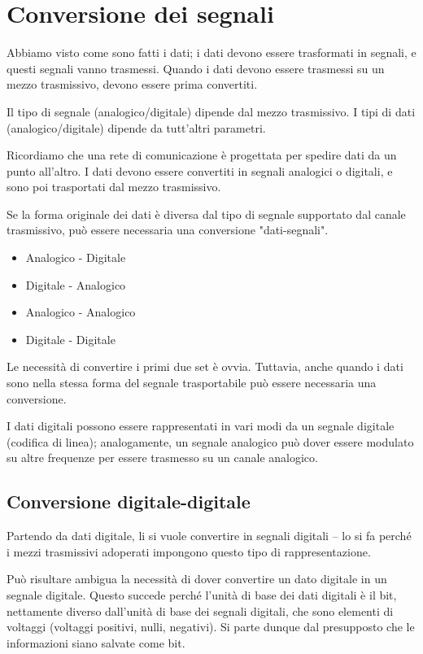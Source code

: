 \section{Conversione dei segnali}

    Abbiamo visto come sono fatti i dati; i dati devono essere trasformati in segnali, e questi segnali vanno trasmessi. Quando i dati devono essere trasmessi su un mezzo trasmissivo, devono essere prima convertiti.
    
    Il tipo di segnale (analogico/digitale) dipende dal mezzo trasmissivo. I tipi di dati (analogico/digitale) dipende da tutt'altri parametri.
    
    Ricordiamo che una rete di comunicazione è progettata per spedire dati da un punto all'altro. I dati devono essere convertiti in segnali analogici o digitali, e sono poi trasportati dal mezzo trasmissivo.
    
    Se la forma originale dei dati è diversa dal tipo di segnale supportato dal canale trasmissivo, può essere necessaria una conversione "dati-segnali".
    
    \begin{itemize}
        \item Analogico - Digitale
        \item Digitale - Analogico
        \item Analogico - Analogico
        \item Digitale - Digitale
    \end{itemize}
    
    Le necessità di convertire i primi due set è ovvia. Tuttavia, anche quando i dati sono nella stessa forma del segnale trasportabile può essere necessaria una conversione. 
    
    I dati digitali possono essere rappresentati in vari modi da un segnale digitale (codifica di linea); analogamente, un segnale analogico può dover essere modulato su altre frequenze per essere trasmesso su un canale analogico.
    
    \subsection{Conversione digitale-digitale}
    
        Partendo da dati digitale, li si vuole convertire in segnali digitali -- lo si fa perché i mezzi trasmissivi adoperati impongono questo tipo di rappresentazione.
        
        Può risultare ambigua la necessità di dover convertire un dato digitale in un segnale digitale. Questo succede perché l'unità di base dei dati digitali è il bit, nettamente diverso dall'unità di base dei segnali digitali, che sono elementi di voltaggi (voltaggi positivi, nulli, negativi). Si parte dunque dal presupposto che le informazioni siano salvate come bit.
        
